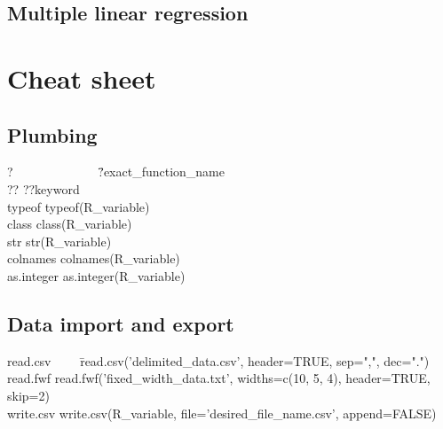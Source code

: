 \documentclass{report}
\begin{document}
	\section{Multiple linear regression}

\chapter{Cheat sheet}

	\section{Plumbing}
\begin{tabbing}
?~~~~~~~~~~~~~ \= ?exact\_function\_name \\
?? \> ??keyword \\
typeof \> typeof(R\_variable) \\
class \> class(R\_variable) \\
str \> str(R\_variable) \\
colnames \> colnames(R\_variable) \\
as.integer \> as.integer(R\_variable)
\end{tabbing}

	\section{Data import and export}
\begin{tabbing}
read.csv~~~~ \= read.csv('delimited\_data.csv', header=TRUE, sep=",", dec=".") \\
read.fwf \> read.fwf('fixed\_width\_data.txt', widths=c(10, 5, 4), header=TRUE, skip=2) \\
write.csv \> write.csv(R\_variable, file='desired\_file\_name.csv', append=FALSE)
\end{tabbing}

\printbibliography

\printnoidxglossaries
\end{document}
